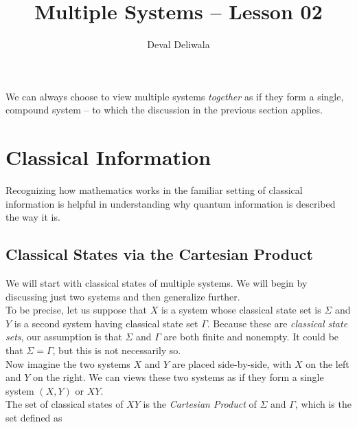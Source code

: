 \documentclass[svgnames]{article}     %
\title{Multiple Systems -- Lesson 02}
\author{Deval Deliwala}
\begin{document}
\maketitle
\tableofcontents                     %
\newpage

We can always choose to view multiple systems \textit{together} as if they form
a single, compound system -- to which the discussion in the previous section
applies. 

\section{Classical Information}

Recognizing how mathematics works in the familiar setting of classical
information is helpful in understanding why quantum information is described
the way it is. 

\subsection{Classical States via the Cartesian Product}

We will start with classical states of multiple systems. We will begin by
discussing just two systems and then generalize further. \\

To be precise, let us suppose that $X$ is a system whose classical state set is
$\Sigma$ and $Y$ is a second system having classical state set $\Gamma$.
Because these are \textit{classical state sets}, our assumption is that
$\Sigma$ and $\Gamma$ are both finite and nonempty. It could be that $\Sigma
= \Gamma$, but this is not necessarily so. \\

Now imagine the two systems  $X$ and $Y$ are placed side-by-side, with $X$ on the left and $Y$ on the right. We can views these two systems as if they form a single system $(X, Y)$ or $XY$. \\

The set of classical states of $XY$ is the \textit{Cartesian Product} of $\Sigma$ and $\Gamma$, which is the set defined as 
\end{document}
